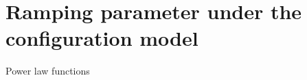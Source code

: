 \chapter{Ramping parameter under the configuration model} %
\label{cha:ramping_parameter_under_the_configuration_model}

Power law functions


